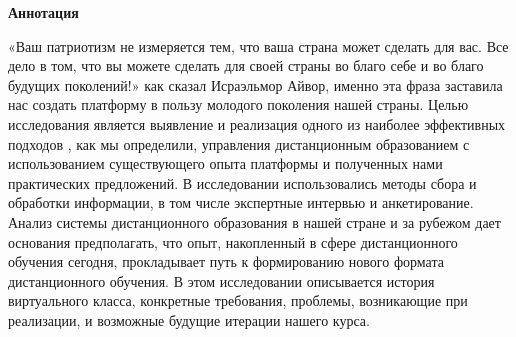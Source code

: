 \newpage
\pagestyle{plain}

{
\begin{center}
    \Large
    \textbf{Аннотация}
\end{center}
\par «Ваш патриотизм не измеряется тем, что ваша страна может сделать для вас. Все дело в том, что вы можете сделать для своей страны во благо себе и во благо будущих поколений!» как сказал Исраэльмор Айвор, именно эта фраза заставила нас создать платформу в пользу молодого поколения нашей страны.
Целью исследования является выявление и реализация одного из наиболее эффективных подходов \parencite{song2004improving}, как мы определили, управления дистанционным образованием с использованием существующего опыта платформы и полученных нами практических предложений. В исследовании использовались методы сбора и обработки информации, в том числе экспертные интервью и анкетирование. Анализ системы дистанционного образования в нашей стране и за рубежом дает основания предполагать, что опыт, накопленный в сфере дистанционного обучения сегодня, прокладывает путь к формированию нового формата дистанционного обучения.\parencite{khan2011let}
В этом исследовании описывается история виртуального класса, конкретные требования, проблемы, возникающие при реализации, и возможные будущие итерации нашего курса.
}
